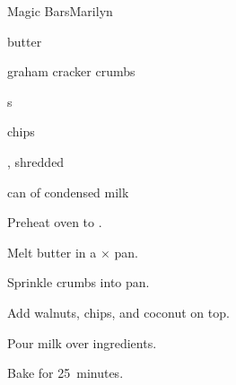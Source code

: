 \begin{recipe}{Magic Bars}{Marilyn}{}

\begin{ingredients}
\item \C{\half} butter
\item \C{1\half} graham cracker crumbs
\item {} s
\item {}  chips
\item \C{1\half} , shredded
\item can of condensed milk
\end{ingredients}

\begin{directions}
\item Preheat oven to .
\item Melt butter in a $\times$ pan.
\item Sprinkle crumbs into pan.
\item Add walnuts, chips, and coconut on top.
\item Pour milk over ingredients.
\item Bake for 25~minutes.
\end{directions}

\end{recipe}
